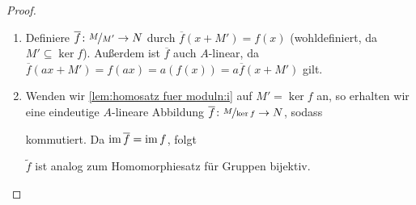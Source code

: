\documentclass[12pt,a4paper]{scrartcl}
\theoremstyle{cplain}
\theoremstyle{cdef}
\begin{document}
\begin{proof}
	\leavevmode
	\begin{enumerate}
		\item Definiere $\overline{f}\colon \nicefrac{M}{M'}\to N$ durch $\overline{f}(x+M') = f(x)$ (wohldefiniert, da $M'\subseteq \ker f$). Außerdem ist $\overline{f}$ auch $A$-linear, da $\overline{f}(ax+M') = f(ax) = a(f(x)) = a\overline{f}(x+M')$ gilt.
        \item Wenden wir \ref{lem:homosatz fuer moduln:i} auf $M' = \ker f$ an, so erhalten wir eine eindeutige $A$-lineare Abbildung $\overline{f}\colon \nicefrac{M}{\operatorname{ker} f}\to N$, sodass
        \begin{figure}[H]
            \centering
        \end{figure}
        
        kommutiert. Da $\operatorname{im}\overline{f} = \operatorname{im} f$, folgt
        \begin{figure}[H]
            \centering
        \end{figure}
		
        $\tilde{f}$ ist analog zum Homomorphiesatz für Gruppen bijektiv.
        \qedhere
	\end{enumerate}
\end{proof}
\end{document}
